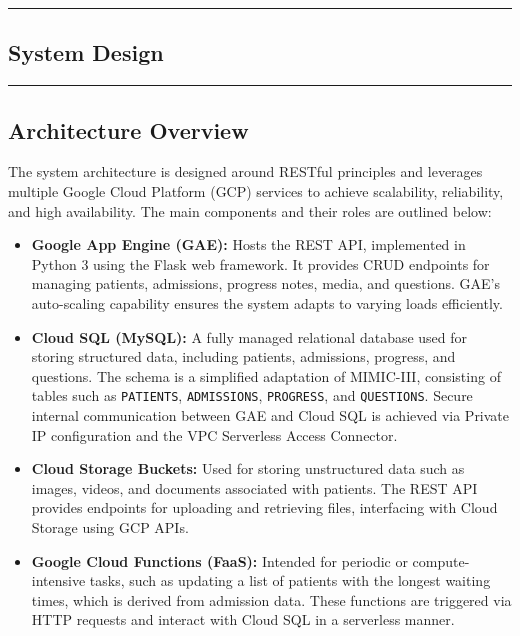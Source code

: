 {\color{gray}\hrule}
\begin{center}
\section{System Design}
\bigskip
\end{center}
{\color{gray}\hrule}
\begin{multicols}{2}

\subsection{Architecture Overview}

The system architecture is designed around RESTful principles and leverages multiple Google Cloud Platform (GCP) services to achieve scalability, reliability, and high availability. The main components and their roles are outlined below:

\begin{itemize}
    \item \textbf{Google App Engine (GAE):} Hosts the REST API, implemented in Python 3 using the Flask web framework. It provides CRUD endpoints for managing patients, admissions, progress notes, media, and questions. GAE’s auto-scaling capability ensures the system adapts to varying loads efficiently.
    
    \item \textbf{Cloud SQL (MySQL):} A fully managed relational database used for storing structured data, including patients, admissions, progress, and questions. The schema is a simplified adaptation of MIMIC-III, consisting of tables such as \texttt{PATIENTS}, \texttt{ADMISSIONS}, \texttt{PROGRESS}, and \texttt{QUESTIONS}. Secure internal communication between GAE and Cloud SQL is achieved via Private IP configuration and the VPC Serverless Access Connector.
    
    \item \textbf{Cloud Storage Buckets:} Used for storing unstructured data such as images, videos, and documents associated with patients. The REST API provides endpoints for uploading and retrieving files, interfacing with Cloud Storage using GCP APIs.
    
    \item \textbf{Google Cloud Functions (FaaS):} Intended for periodic or compute-intensive tasks, such as updating a list of patients with the longest waiting times, which is derived from admission data. These functions are triggered via HTTP requests and interact with Cloud SQL in a serverless manner.
    

\end{itemize}
\end{multicols}
